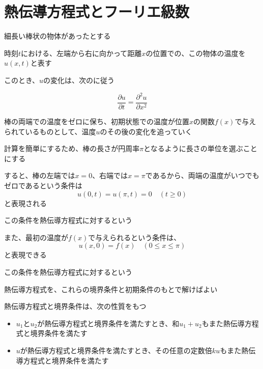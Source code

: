 \documentclass[../book_why-set-theory-why-topology]{subfiles}
\begin{document}
\section{熱伝導方程式とフーリエ級数}

細長い棒状の物体があったとする

時刻$t$における、左端から右に向かって距離$x$の位置での、この物体の温度を$u(x,t)$と表す

このとき、$u$の変化は、次のに従う

\begin{equation*}
  \frac{\partial u}{\partial t} = \frac{\partial^2 u}{\partial x^2}
\end{equation*}

\sectionline

棒の両端での温度をゼロに保ち、初期状態での温度が位置$x$の関数$f(x)$で与えられているものとして、温度$u$のその後の変化を追っていく

\br

計算を簡単にするため、棒の長さが円周率$\pi$となるように長さの単位を選ぶことにする

\br

すると、棒の左端では$x=0$、右端では$x=\pi$であるから、両端の温度がいつでもゼロであるという条件は
\begin{equation*}
  u(0,t) = u(\pi,t) = 0 \quad (t \geq 0)
\end{equation*}
と表現される

この条件を熱伝導方程式に対するという

\br

また、最初の温度が$f(x)$で与えられるという条件は、
\begin{equation*}
  u(x,0) = f(x) \quad (0 \leq x \leq \pi)
\end{equation*}
と表現できる

この条件を熱伝導方程式に対するという

\br

熱伝導方程式を、これらの境界条件と初期条件のもとで解けばよい

\sectionline

熱伝導方程式と境界条件は、次の性質をもつ

\begin{itemize}
  \item $u_1$と$u_2$が熱伝導方程式と境界条件を満たすとき、和$u_1 + u_2$もまた熱伝導方程式と境界条件を満たす
  \item $u$が熱伝導方程式と境界条件を満たすとき、その任意の定数倍$ku$もまた熱伝導方程式と境界条件を満たす
\end{itemize}
\end{document}
